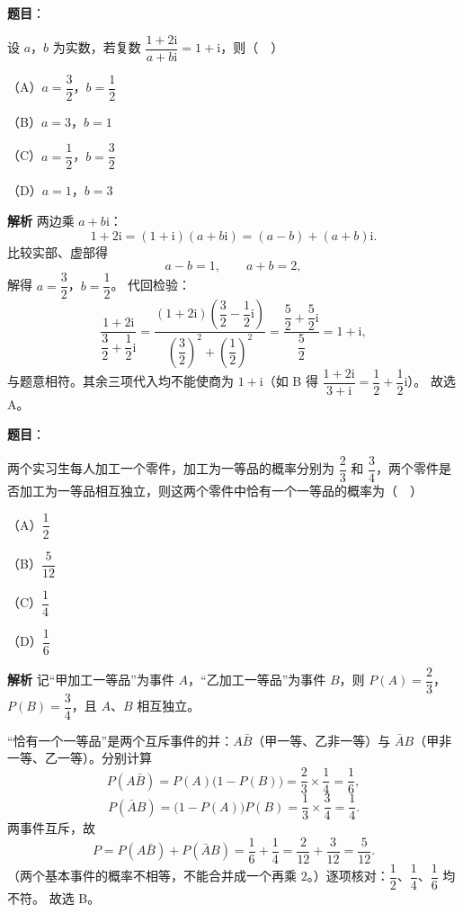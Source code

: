 \begin{answer}

\textbf{题目}：

设 $a$，$b$ 为实数，若复数 $\dfrac{1+2\mathrm i}{a+b\mathrm i}=1+\mathrm i$，则（　）

（A）$a=\dfrac32$，$b=\dfrac12$

（B）$a=3$，$b=1$

（C）$a=\dfrac12$，$b=\dfrac32$

（D）$a=1$，$b=3$

\textbf{解析}
两边乘 $a+b\mathrm i$：
\nopagebreak[4]
\[1+2\mathrm i=(1+\mathrm i)(a+b\mathrm i)=(a-b)+(a+b)\mathrm i.\]
比较实部、虚部得
\nopagebreak[4]
\[a-b=1,\qquad a+b=2,\]
解得 $a=\dfrac32$，$b=\dfrac12$。
代回检验：
\nopagebreak[4]
\[\frac{1+2\mathrm i}{\dfrac32+\dfrac12\mathrm i}=\frac{(1+2\mathrm i)\left(\dfrac32-\dfrac12\mathrm i\right)}{\left(\dfrac32\right)^2+\left(\dfrac12\right)^2}=\frac{\dfrac52+\dfrac52\mathrm i}{\dfrac52}=1+\mathrm i,\]
与题意相符。其余三项代入均不能使商为 $1+\mathrm i$（如 B 得 $\dfrac{1+2\mathrm i}{3+\mathrm i}=\dfrac12+\dfrac12\mathrm i$）。
故选 A。


\end{answer}
\begin{answer}

\textbf{题目}：

两个实习生每人加工一个零件，加工为一等品的概率分别为 $\dfrac23$ 和 $\dfrac34$，两个零件是否加工为一等品相互独立，则这两个零件中恰有一个一等品的概率为（　）

（A）$\dfrac12$

（B）$\dfrac{5}{12}$

（C）$\dfrac14$

（D）$\dfrac16$

\textbf{解析}
记“甲加工一等品”为事件 $A$，“乙加工一等品”为事件 $B$，则 $P(A)=\dfrac23$，$P(B)=\dfrac34$，且 $A$、$B$ 相互独立。

“恰有一个一等品”是两个互斥事件的并：$A\bar B$（甲一等、乙非一等）与 $\bar AB$（甲非一等、乙一等）。分别计算
\nopagebreak[4]
\[P(A\bar B)=P(A)\bigl(1-P(B)\bigr)=\frac23\times\frac14=\frac16,\]
\nopagebreak[4]
\[P(\bar AB)=\bigl(1-P(A)\bigr)P(B)=\frac13\times\frac34=\frac14.\]
两事件互斥，故
\nopagebreak[4]
\[P=P(A\bar B)+P(\bar AB)=\frac16+\frac14=\frac{2}{12}+\frac{3}{12}=\frac{5}{12}.\]
（两个基本事件的概率不相等，不能合并成一个再乘 $2$。）逐项核对：$\dfrac12$、$\dfrac14$、$\dfrac16$ 均不符。
故选 B。


\end{answer}
